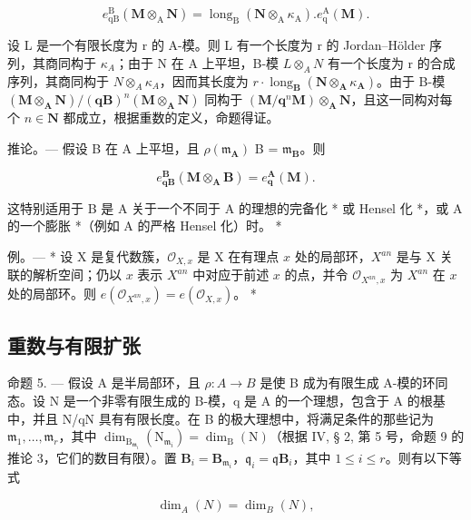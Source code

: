 \[
e _ {\mathrm{qB}} ^ {\mathrm{B}} (\mathbf {M} \otimes_ {\mathrm{A}} \mathbf {N}) = \operatorname{long} _ {\mathrm{B}} (\mathbf {N} \otimes_ {\mathrm{A}} \kappa_ {\mathrm{A}}). e _ {\mathrm{q}} ^ {\mathrm{A}} (\mathbf {M}).
\]

设 L 是一个有限长度为 r 的 A-模。则 L 有一个长度为 r 的 Jordan–Hölder 序列，其商同构于 \(\kappa_{A}\)；由于 N 在 A 上平坦，B-模 \(L \otimes_{A} N\) 有一个长度为 r 的合成序列，其商同构于 \(N \otimes_{A} \kappa_{A}\)，因而其长度为 \(r \cdot \operatorname{long}_{\mathbf{B}}(\mathbf{N} \otimes_{\mathbf{A}} \kappa_{\mathbf{A}})\)。由于 B-模 \((\mathbf{M} \otimes_{\mathbf{A}} \mathbf{N})/(\mathbf{q}\mathbf{B})^{n}(\mathbf{M} \otimes_{\mathbf{A}} \mathbf{N})\) 同构于 \((\mathbf{M}/\mathbf{q}^{n}\mathbf{M}) \otimes_{\mathbf{A}} \mathbf{N}\)，且这一同构对每个 \(n \in \mathbf{N}\) 都成立，根据重数的定义，命题得证。

推论。— 假设 B 在 A 上平坦，且 \(\rho(\mathfrak{m}_{\mathbf{A}})\) B = \(\mathfrak{m}_{\mathbf{B}}\)。则

\[
e _ {\mathbf {q B}} ^ {\mathbf {B}} (\mathbf {M} \otimes_ {\mathbf {A}} \mathbf {B}) = e _ {\mathbf {q}} ^ {\mathbf {A}} (\mathbf {M}).
\]

这特别适用于 B 是 A 关于一个不同于 A 的理想的完备化 * 或 Hensel 化 *，或 A 的一个膨胀 *（例如 A 的严格 Hensel 化）时。 *

例。— * 设 X 是复代数簇，\(\mathcal{O}_{X,x}\) 是 X 在有理点 \(x\) 处的局部环，\(X^{an}\) 是与 X 关联的解析空间；仍以 \(x\) 表示 \(X^{an}\) 中对应于前述 \(x\) 的点，并令 \(\mathcal{O}_{X^{an},x}\) 为 \(X^{an}\) 在 \(x\) 处的局部环。则 \(e(\mathcal{O}_{X^{an},x}) = e(\mathcal{O}_{X,x})\)。 *

\subsection{重数与有限扩张}

命题 5. — 假设 A 是半局部环，且 \(\rho: A \to B\) 是使 B 成为有限生成 A-模的环同态。设 N 是一个非零有限生成的 B-模，q 是 A 的一个理想，包含于 A 的根基中，并且 N/qN 具有有限长度。在 B 的极大理想中，将满足条件的那些记为 \(\mathfrak{m}_1, \ldots, \mathfrak{m}_r\)，其中 \(\dim_{\mathrm{B}_{\mathfrak{m}_i}} (\mathrm{N}_{\mathfrak{m}_i}) = \dim_{\mathrm{B}} (\mathrm{N})\)（根据 IV, § 2, 第 5 号，命题 9 的推论 3，它们的数目有限）。置 \(\mathbf{B}_i = \mathbf{B}_{\mathfrak{m}_i}\)，\(\mathfrak{q}_i = \mathfrak{q}\mathbf{B}_i\)，其中 \(1 \leqslant i \leqslant r\)。则有以下等式

\[
\dim_ {A} (N) = \dim_ {B} (N),
\]


